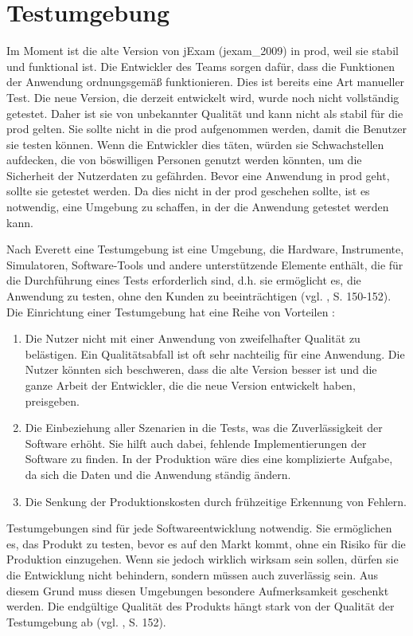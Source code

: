 \section{Testumgebung}

Im Moment ist die alte Version von jExam (\gls{jexam_2009})
in \gls{prod}, weil sie stabil und funktional ist.
Die Entwickler des Teams sorgen dafür, dass die
Funktionen der Anwendung ordnungsgemäß funktionieren.
Dies ist bereits eine Art manueller Test. Die neue
Version, die derzeit entwickelt wird, wurde noch nicht
vollständig getestet. Daher ist sie von unbekannter
Qualität und kann nicht als stabil für die \gls{prod}
gelten. Sie sollte nicht in die \gls{prod} aufgenommen
werden, damit die Benutzer sie testen können.  Wenn
die Entwickler dies täten, würden sie Schwachstellen
aufdecken, die von böswilligen Personen genutzt werden
könnten, um die Sicherheit der Nutzerdaten zu
gefährden. Bevor eine Anwendung in \gls{prod} geht,
sollte sie getestet werden. Da dies nicht in der
\gls{prod} geschehen sollte, ist es notwendig, eine
Umgebung zu schaffen, in der die Anwendung getestet
werden kann.


Nach Everett eine Testumgebung ist eine Umgebung,
die Hardware, Instrumente, Simulatoren, Software-Tools
und andere unterstützende Elemente enthält, die für
die Durchführung eines Tests erforderlich sind,
d.h. sie ermöglicht es, die Anwendung zu testen, ohne
den Kunden zu beeinträchtigen (vgl. \cite{shultz2011software}, S. 150-152).
Die Einrichtung einer Testumgebung hat eine Reihe von Vorteilen :

\noindent
\begin{enumerate}
    \item Die Nutzer nicht mit einer Anwendung von
    zweifelhafter Qualität zu belästigen. Ein
    Qualitätsabfall ist oft sehr nachteilig für eine
    Anwendung. Die Nutzer könnten sich beschweren,
    dass die alte Version besser ist und die ganze
    Arbeit der Entwickler, die die neue Version
    entwickelt haben, preisgeben.

    \item Die Einbeziehung aller Szenarien in die
    Tests, was die Zuverlässigkeit der Software
    erhöht. Sie hilft auch dabei, fehlende
    Implementierungen der Software zu finden. In der
    Produktion wäre dies eine komplizierte Aufgabe, da
    sich die Daten und die Anwendung ständig ändern.

    \item Die Senkung der Produktionskosten durch
    frühzeitige Erkennung von Fehlern.

\end{enumerate}

Testumgebungen sind für jede Softwareentwicklung
notwendig. Sie ermöglichen es, das Produkt zu testen,
bevor es auf den Markt kommt, ohne ein Risiko für die
Produktion einzugehen. Wenn sie jedoch wirklich
wirksam sein sollen, dürfen sie die Entwicklung nicht
behindern, sondern müssen auch zuverlässig sein. Aus
diesem Grund muss diesen Umgebungen besondere
Aufmerksamkeit geschenkt werden. Die endgültige
Qualität des Produkts hängt stark von der Qualität der
Testumgebung ab (vgl. \cite{shultz2011software}, S. 152).

